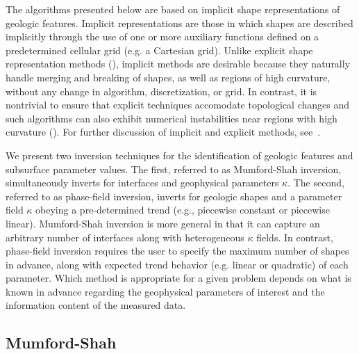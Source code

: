 \documentclass[manuscript,revised]{geophysics}
\begin{document}
The algorithms presented below are based on implicit shape representations of geologic features.  Implicit representations are those in which shapes are described implicitly through the use of one or more auxiliary functions defined on a predetermined cellular grid (e.g. a Cartesian grid). Unlike explicit shape representation methods (\cite{Galley20}), implicit methods are desirable because they naturally handle merging and breaking of shapes, as well as regions of high curvature, without any change in algorithm, discretization, or grid.   In contrast, it is nontrivial to ensure that explicit techniques accomodate topological changes and such algorithms can also exhibit numerical instabilities near regions with high curvature (\cite{Abubakar_2009}).  For further discussion of implicit and explicit methods, see~\cite{Osher_1988}.

We present two inversion techniques for the identification of geologic features and subsurface parameter values.  The first, referred to as Mumford-Shah inversion, simultaneously inverts for interfaces and geophysical parameters $\kappa$. The second, referred to as phase-field inversion, inverts for geologic shapes and a parameter field $\kappa$ obeying a pre-determined trend (e.g., piecewise constant or piecewise linear). Mumford-Shah inversion is more general in that it can capture an arbitrary number of interfaces along with heterogeneous $\kappa$ fields. In contrast, phase-field inversion requires the user to specify the maximum number of shapes in advance, along with expected trend behavior (e.g. linear or quadratic) of each parameter.  Which method is appropriate for a given problem depends on what is known in advance regarding the geophysical parameters of interest and the information content of the measured data. 

\subsection{Mumford-Shah}
\end{document}
